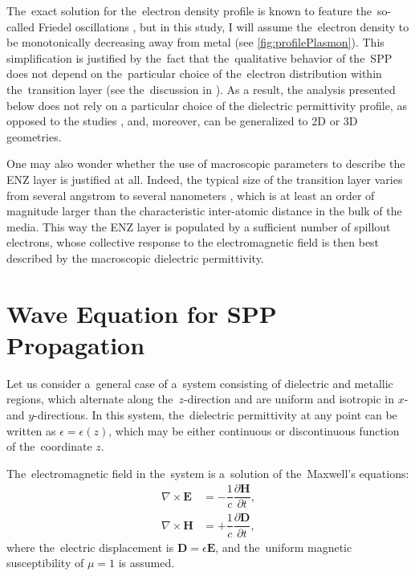 The~exact solution for the~electron density profile is known to feature the~so-called Friedel oscillations \cite{friedel}, but in this study, I will assume the~electron density to be monotonically decreasing away from metal (see \cref{fig:profilePlasmon}).
This simplification is justified by the~fact that the~qualitative behavior of the~SPP does not depend on the~particular choice of the~electron distribution within the~transition layer (see the~discussion in \cite{prigogine}).
As a result, the analysis presented below does not rely on a particular choice of the dielectric permittivity profile, as opposed to the studies \cite{akimov,gabitov1,gabitov2}, and, moreover, can be generalized to 2D or 3D geometries.

One may also wonder whether the use of macroscopic parameters to describe the ENZ layer is justified at all.
Indeed, the typical size of the transition layer varies from several angstrom to several nanometers \cite{akimov}, which is at least an order of magnitude larger than the characteristic inter-atomic distance in the bulk of the media.
This way the ENZ layer is populated by a sufficient number of spillout electrons, whose collective response to the electromagnetic field is then best described by the macroscopic dielectric permittivity.


\section{Wave Equation for SPP Propagation}

Let us consider a~general case of a~system consisting of dielectric and metallic regions, which alternate along the~$z$-direction and are uniform and isotropic in $x$- and $y$-directions.
In this system, the~dielectric permittivity at any point can be written as $\epsilon = \epsilon(z)$, which may be either continuous or discontinuous function of the~coordinate $z$.

The~electromagnetic field in the~system is a~solution of the~Maxwell's equations:
%
\begin{align}
\nabla \times \mathbf{E} &= -\dfrac{1}{c} \dfrac{\partial \mathbf{H}}{\partial t}, \label{eq:maxwellE} \\
\nabla \times \mathbf{H} &= +\dfrac{1}{c} \dfrac{\partial \mathbf{D}}{\partial t}, \label{eq:maxwellH}
\end{align}
%
where the~electric displacement is $\mathbf{D} = \epsilon \mathbf{E}$, and the~uniform magnetic susceptibility of $\mu = 1$ is assumed.

